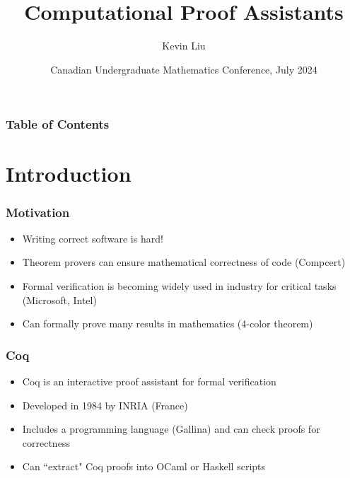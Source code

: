 \documentclass{beamer}
\title[Computational Proof Assistants] %
{Computational Proof Assistants}
\author[Liu, Kevin] %
{Kevin Liu}
\institute[UBC] %
\date[CUMC 2024] %
{Canadian Undergraduate Mathematics Conference, July 2024}
\begin{document}
\frame{\titlepage}


\begin{frame}
\frametitle{Table of Contents}
\tableofcontents
\end{frame}


\section{Introduction}

\begin{frame}
\frametitle{Motivation}

\begin{itemize}
    \item Writing correct software is hard!
    \item Theorem provers can ensure mathematical correctness of code (Compcert)
    \item Formal verification is becoming widely used in industry for critical tasks (Microsoft, Intel)
    \item Can formally prove many results in mathematics (4-color theorem)
\end{itemize}
\end{frame}



\begin{frame}
\frametitle{Coq}
\begin{itemize}
    \item Coq is an interactive proof assistant for formal verification
    \item Developed in 1984 by INRIA (France)
    \item Includes a programming language (Gallina) and can check proofs for correctness
    \item Can ``extract" Coq proofs into OCaml or Haskell scripts
\end{itemize}
\end{frame}
\end{document}
